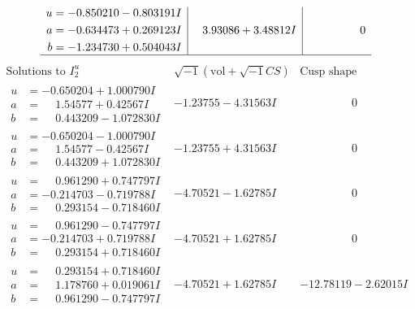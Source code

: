 \documentclass[1p]{elsarticle_modified}
\theoremstyle{definition}
\newcommand{\I}{\sqrt{-1}}
\begin{document}
$$\begin{array}{c|c|c}
\begin{aligned}
u &= -0.850210 - 0.803191 I \\
a &= -0.634473 + 0.269123 I \\
b &= -1.234730 + 0.504043 I\end{aligned}
 & \phantom{-}3.93086 + 3.48812 I & \phantom{-0.000000 } 0\\
 \hline 
 \end{array}$$\newpage$$\begin{array}{c|c|c}  
\text{Solutions to }I^u_{2}& \I (\text{vol} + \sqrt{-1}CS) & \text{Cusp shape}\\
 \hline 
\begin{aligned}
u &= -0.650204 + 1.000790 I \\
a &= \phantom{-}1.54577 + 0.42567 I \\
b &= \phantom{-}0.443209 - 1.072830 I\end{aligned}
 & -1.23755 - 4.31563 I & \phantom{-0.000000 } 0 \\ \hline\begin{aligned}
u &= -0.650204 - 1.000790 I \\
a &= \phantom{-}1.54577 - 0.42567 I \\
b &= \phantom{-}0.443209 + 1.072830 I\end{aligned}
 & -1.23755 + 4.31563 I & \phantom{-0.000000 } 0 \\ \hline\begin{aligned}
u &= \phantom{-}0.961290 + 0.747797 I \\
a &= -0.214703 - 0.719788 I \\
b &= \phantom{-}0.293154 - 0.718460 I\end{aligned}
 & -4.70521 - 1.62785 I & \phantom{-0.000000 } 0 \\ \hline\begin{aligned}
u &= \phantom{-}0.961290 - 0.747797 I \\
a &= -0.214703 + 0.719788 I \\
b &= \phantom{-}0.293154 + 0.718460 I\end{aligned}
 & -4.70521 + 1.62785 I & \phantom{-0.000000 } 0 \\ \hline\begin{aligned}
u &= \phantom{-}0.293154 + 0.718460 I \\
a &= \phantom{-}1.178760 + 0.019061 I \\
b &= \phantom{-}0.961290 - 0.747797 I\end{aligned}
 & -4.70521 + 1.62785 I & -12.78119 - 2.62015 I \\ \hline\begin{aligned}

\end{aligned}
\end{array}$$
\end{document}
